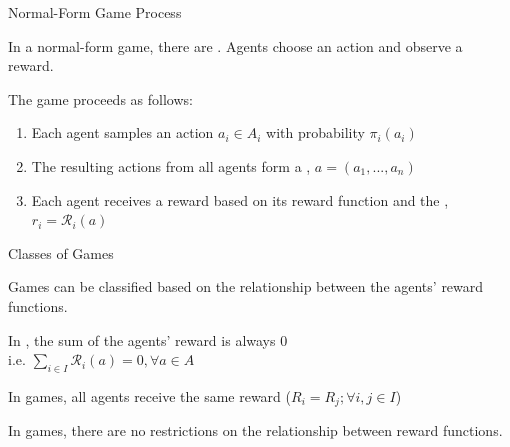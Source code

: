 \begin{frame}{Normal-Form Game Process}

    In a normal-form game, there are . Agents choose an action and observe a reward.
    \vspace{10pt}
    
    The game proceeds as follows:
    \pause
    
    \begin{enumerate}
        \item<2-> Each agent samples an action \(a_i \in A_i\) with probability \(\pi_i(a_i)\)
        \pause
        \item<3-> The resulting actions from all agents form a , \(a = (a_1, ... , a_n)\)
        \pause
        \item<4-> Each agent receives a reward based on its  reward function and the , \(r_i = \mathcal{R}_i(a)\)
    \end{enumerate}
    
\end{frame}

\begin{frame}{Classes of Games}

    Games can be classified based on the relationship between the agents' reward functions. 

    \blist
        \item<1-> In , the sum of the agents' reward is always 0\\
        i.e. \(\sum_{i \in I} \mathcal{R}_{i} (a) = 0, \forall a \in A\)

        \item<2-> In  games, all agents receive the same reward 
        (\(R_i = R_j ; \forall i, j \in I\))

        \item<3-> In  games, there are no restrictions on the relationship between reward functions. 
    \elist
    
\end{frame}

